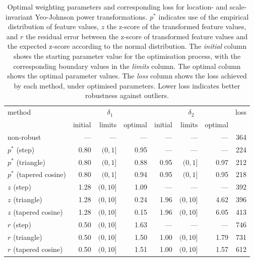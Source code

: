 \documentclass[preprint,12pt,authoryear]{elsarticle}
\begin{document}
\begin{table}
\begin{center}
\caption{Optimal weighting parameters and corresponding loss for location- and scale-invariant Yeo-Johnson power transformations. $p^{*}$ indicates use of the empirical distribution of feature values, $z$ the z-score of the transformed feature values, and $r$ the residual error between the z-score of transformed feature values and the expected z-score according to the normal distribution. The \textit{initial} column shows the starting parameter value for the optimisation process, with the corresponding boundary values in the \textit{limits} column. The {optimal} column shows the optimal parameter values. The \textit{loss} column shows the loss achieved by each method, under optimised parameters. Lower loss indicates better robustness against outliers.}
\label{tab:optimal-weighting-parameters-yeo-johnson}
\begin{tabular}{l r r r r r r r}

\toprule
method & \multicolumn{3}{c}{$\delta_1$} & \multicolumn{3}{c}{$\delta_2$} & loss \\
& initial & limits & optimal & initial & limits & optimal & \\

\midrule
non-robust               & ---  & ---       & ---  & ---  & ---       & ---  & 364 \\
$p^{*}$ (step)           & 0.80 & $(0, 1]$  & 0.95 & ---  & ---       & ---  & 224 \\
$p^{*}$ (triangle)       & 0.80 & $(0, 1]$  & 0.88 & 0.95 & $(0, 1]$  & 0.97 & 212 \\
$p^{*}$ (tapered cosine) & 0.80 & $(0, 1]$  & 0.94 & 0.95 & $(0, 1]$  & 0.95 & 218 \\
$z$ (step)               & 1.28 & $(0, 10]$ & 1.09 & ---  & ---       & ---  & 392 \\
$z$ (triangle)           & 1.28 & $(0, 10]$ & 0.24 & 1.96 & $(0, 10]$ & 4.62 & 396 \\
$z$ (tapered cosine)     & 1.28 & $(0, 10]$ & 0.15 & 1.96 & $(0, 10]$ & 6.05 & 413 \\
$r$ (step)               & 0.50 & $(0, 10]$ & 1.63 & ---  & ---       & ---  & 746 \\
$r$ (triangle)           & 0.50 & $(0, 10]$ & 1.50 & 1.00 & $(0, 10]$ & 1.79 & 731 \\
$r$ (tapered cosine)     & 0.50 & $(0, 10]$ & 1.51 & 1.00 & $(0, 10]$ & 1.57 & 612 \\
\bottomrule
\end{tabular}
\end{center}
\end{table}
\end{document}

